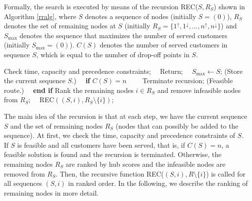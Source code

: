 \documentclass[dissertation,draft*]{aaltoseries}
\begin{document}
Formally, the search is executed by means of the recursion 
REC($S,R_S$) shown in Algorithm \ref{rralg}, where $S$ denotes a sequence of nodes (initially $S=(0)$), $R_S$ denotes %
the set of remaining nodes at $S$ (initially $R_S=\{1^{\uparrow},1^{\downarrow}, \ldots, n^{\uparrow},n^{\downarrow}\}$) and $S_{\max}$ denotes the sequence that maximizes the number 
of served customers (initially $S_{\max} = (0)$). $C(S)$ denotes the number of served customers in sequence $S$, which is equal to the 
number of drop-off points in $S$.
\begin{algorithm}
{\footnotesize
\begin{algorithmic}
\STATE Check time, capacity and precedence constraints;
\STATE \ \ Return;
\ENDIF
 \STATE \ \ $S_{\max} \leftarrow S$;   \hfill (Store the current sequence $S$.) %
 \STATE \ \ \textbf{if} $C(S) = n$
 \STATE \ \ \ \ Terminate recursion; \hfill (Feasible route.)
 \STATE \ \ \textbf{end if}
 \ENDIF
\STATE Rank the remaining nodes $i \in R_S$ and remove infeasible nodes from $R_S$; 
\STATE \ \ REC$((S,i) , R_S \setminus \{i\})$; %
\ENDFOR
\end{algorithmic}
\caption{\footnotesize A recursive solution REC($S,R_S$) to the single-vehicle DARP. $S$ denotes a sequence of 
nodes (initially $S=(0)$), $R_S$ denotes %
the set of remaining nodes (initially $R_S=\{1^{\uparrow},1^{\downarrow}, \ldots, n^{\uparrow},n^{\downarrow}\}$) and $S_{\max}$ denotes the sequence that maximizes the number 
of served customers (initially $S_{\max} = (0)$). $C(S)$ denotes the number of served customers in sequence $S$, which is equal to the 
number of drop-off points in $S$.}
\label{rralg}
}
\end{algorithm}

The main idea of the recursion is that at each step, we have the current sequence $S$ 
and the set of remaining nodes $R_S$ (nodes that can possibly be added to the sequence). 
At first, we check the time, capacity and precedence constraints of $S$.
If $S$ is feasible and all customers have been served, that is, if $C(S) = n$, a feasible solution is found and 
the recursion is terminated.
Otherwise,
the remaining nodes $R_S$ are ranked by hub scores and the infeasible nodes 
are removed from $R_S$.
Then, the recursive function REC($(S,i),R \setminus \{i\}$) is called
for all sequences $(S,i)$ in ranked order.
In the following, we describe the ranking of remaining nodes in more detail.
\end{document}
